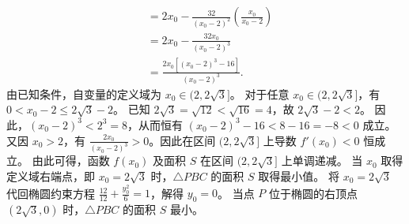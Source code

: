 \begin{solution}
\begin{align*}
&= 2x_0 - \frac{32}{(x_0 - 2)^2} \left( \frac{x_0}{x_0 - 2} \right) \\
&= 2x_0 - \frac{32x_0}{(x_0 - 2)^3} \\
&= \frac{2x_0 \left[ (x_0 - 2)^3 - 16 \right]}{(x_0 - 2)^3}.
\end{align*}
由已知条件，自变量的定义域为 $x_0 \in (2, 2\sqrt{3}]$。
对于任意 $x_0 \in (2, 2\sqrt{3}]$，有 $0 < x_0 - 2 \le 2\sqrt{3} - 2$。
已知 $2\sqrt{3} = \sqrt{12} < \sqrt{16} = 4$，故 $2\sqrt{3} - 2 < 2$。
因此，$(x_0 - 2)^3 < 2^3 = 8$，从而恒有 $(x_0 - 2)^3 - 16 < 8 - 16 = -8 < 0$ 成立。
又因 $x_0 > 2$，有 $\frac{2x_0}{(x_0 - 2)^3} > 0$。因此在区间 $(2, 2\sqrt{3}]$ 上导数 $f'(x_0) < 0$ 恒成立。
由此可得，函数 $f(x_0)$ 及面积 $S$ 在区间 $(2, 2\sqrt{3}]$ 上单调递减。
当 $x_0$ 取得定义域右端点，即 $x_0 = 2\sqrt{3}$ 时，$\triangle PBC$ 的面积 $S$ 取得最小值。
将 $x_0 = 2\sqrt{3}$ 代回椭圆约束方程 $\frac{12}{12} + \frac{y_0^2}{6} = 1$，解得 $y_0 = 0$。
当点 $P$ 位于椭圆的右顶点 $(2\sqrt{3}, 0)$ 时，$\triangle PBC$ 的面积 $S$ 最小。
\end{solution}



